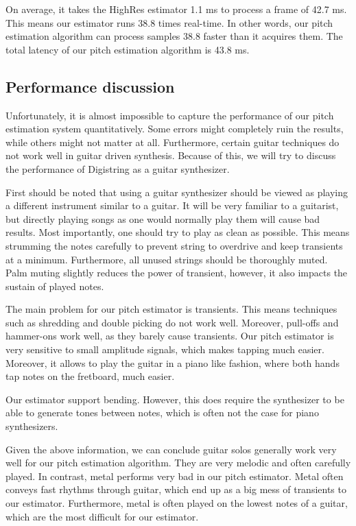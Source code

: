 \documentclass[a4paper,10pt,twocolumn]{article}
\begin{document}
On average, it takes the HighRes estimator 1.1 ms to process a frame of 42.7 ms. This means our estimator runs 38.8 times real-time. In other words, our pitch estimation algorithm can process samples 38.8 faster than it acquires them. The total latency of our pitch estimation algorithm is 43.8 ms.


\subsection{Performance discussion}  \label{sub:watvindik}
Unfortunately, it is almost impossible to capture the performance of our pitch estimation system quantitatively. Some errors might completely ruin the results, while others might not matter at all. Furthermore, certain guitar techniques do not work well in guitar driven synthesis. Because of this, we will try to discuss the performance of Digistring as a guitar synthesizer.%

First should be noted that using a guitar synthesizer should be viewed as playing a different instrument similar to a guitar. It will be very familiar to a guitarist, but directly playing songs as one would normally play them will cause bad results. Most importantly, one should try to play as clean as possible. This means strumming the notes carefully to prevent string to overdrive and keep transients at a minimum. Furthermore, all unused strings should be thoroughly muted. Palm muting slightly reduces the power of transient, however, it also impacts the sustain of played notes.

The main problem for our pitch estimator is transients. This means techniques such as shredding and double picking do not work well. Moreover, pull-offs and hammer-ons work well, as they barely cause transients. Our pitch estimator is very sensitive to small amplitude signals, which makes tapping much easier. Moreover, it allows to play the guitar in a piano like fashion, where both hands tap notes on the fretboard, much easier.

Our estimator support bending. However, this does require the synthesizer to be able to generate tones between notes, which is often not the case for piano synthesizers.

Given the above information, we can conclude guitar solos generally work very well for our pitch estimation algorithm. They are very melodic and often carefully played. In contrast, metal performs very bad in our pitch estimator. Metal often conveys fast rhythms through guitar, which end up as a big mess of transients to our estimator. Furthermore, metal is often played on the lowest notes of a guitar, which are the most difficult for our estimator.
\end{document}
